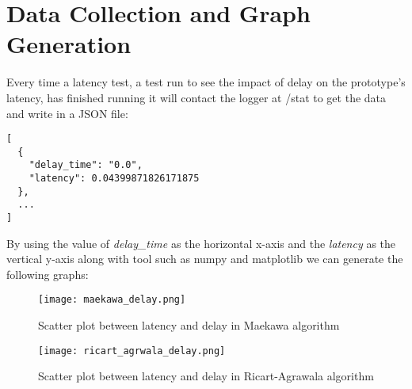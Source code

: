 \section{Data Collection and Graph Generation}

Every time a latency test, a test run to see the impact of delay on the prototype's
latency, has finished running it will contact the logger at /stat to get the 
data and write in a JSON file:
  
\begin{listing}[!ht]
  \begin{verbatim}
[
  {
    "delay_time": "0.0",
    "latency": 0.04399871826171875
  },
  ...
]
  \end{verbatim}
  \caption{Latency data obtain from the logger}
\end{listing}


By using the value of \textit{delay\_time} as the horizontal x-axis and the \textit{latency}
as the vertical y-axis along with tool such as numpy and matplotlib we can generate the following 
graphs:

\begin{figure}[htbp]
  \centering
  \texttt{[image: maekawa\_delay.png]}
  \caption{Scatter plot between latency and delay in Maekawa algorithm}
\end{figure}

\begin{figure}[htbp]
  \centering
  \texttt{[image: ricart\_agrwala\_delay.png]}
  \caption{Scatter plot between latency and delay in Ricart-Agrawala algorithm}
\end{figure}
